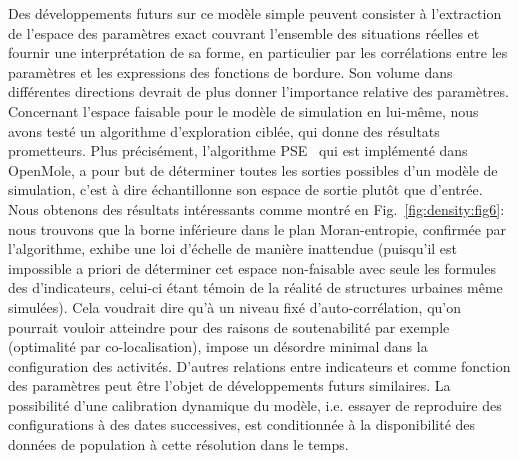 {Des développements futurs sur ce modèle simple peuvent consister à l'extraction de l'espace des paramètres exact couvrant l'ensemble des situations réelles et fournir une interprétation de sa forme, en particulier par les corrélations entre les paramètres et les expressions des fonctions de bordure. Son volume dans différentes directions devrait de plus donner l'importance relative des paramètres. Concernant l'espace faisable pour le modèle de simulation en lui-même, nous avons testé un algorithme d'exploration ciblée, qui donne des résultats prometteurs. Plus précisément, l'algorithme PSE~\cite{10.1371/journal.pone.0138212} qui est implémenté dans OpenMole, a pour but de déterminer toutes les sorties possibles d'un modèle de simulation, c'est à dire échantillonne son espace de sortie plutôt que d'entrée. Nous obtenons des résultats intéressants comme montré en Fig.~\ref{fig:density:fig6}: nous trouvons que la borne inférieure dans le plan Moran-entropie, confirmée par l'algorithme, exhibe une loi d'échelle de manière inattendue (puisqu'il est impossible a priori de déterminer cet espace non-faisable avec seule les formules des d'indicateurs, celui-ci étant témoin de la réalité de structures urbaines même simulées). Cela voudrait dire qu'à un niveau fixé d'auto-corrélation, qu'on pourrait vouloir atteindre pour des raisons de soutenabilité par exemple (optimalité par co-localisation), impose un désordre minimal dans la configuration des activités. D'autres relations entre indicateurs et comme fonction des paramètres peut être l'objet de développements futurs similaires. La possibilité d'une calibration dynamique du modèle, i.e. essayer de reproduire des configurations à des dates successives, est conditionnée à la disponibilité des données de population à cette résolution dans le temps.
}


